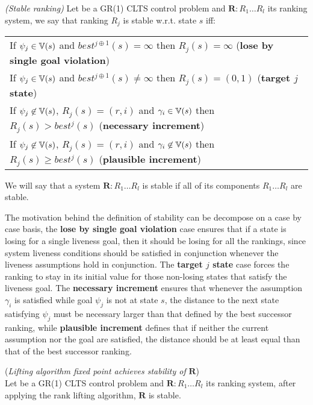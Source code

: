 \begin{definition}\label{def:gr1_stable_ranking} \emph{(Stable ranking)} 
	Let \controlProblemDef be a GR(1) CLTS control problem and $\mathbf{R}:R_1 \ldots R_l$ its ranking system, we say that ranking $R_j$ is stable w.r.t. state $s$ iff:
	\vspace{1em}
	\begin{center}
		\begin{tabular}{l}
			If $\psi_j \in \mathbb{V}(s)$ and $best^{j \oplus 1}(s) = \infty$ then $R_j(s) = \infty$ (\textbf{lose by single goal violation})\\
			If $\psi_j \in \mathbb{V}(s)$ and $best^{j \oplus 1}(s) \neq \infty$ then $R_j(s) = (0,1)$ (\textbf{target $j$ state})\\			
			If $\psi_j \not\in \mathbb{V}(s)$, $R_j(s) = (r,i)$ and $\gamma_i \in \mathbb{V}(s)$ then  $R_j(s) > best^j(s)$ (\textbf{necessary increment})\\						
			If $\psi_j \not\in \mathbb{V}(s)$, $R_j(s) = (r,i)$ and $\gamma_i \not\in \mathbb{V}(s)$ then  $R_j(s) \geq best^j(s)$ (\textbf{plausible increment})\\
		\end{tabular}
	\end{center}
We will say that a system $\mathbf{R}:R_1 \ldots R_l$ is stable if all of its components $R_1 \ldots R_l$ are stable.
\end{definition}

The motivation behind the definition of stability can be decompose on a case by case basis, the \textbf{lose by single goal violation} case ensures that if a state is losing for a single liveness goal, then it should be losing for all the rankings, since system liveness conditions should be satisfied in conjunction whenever the liveness assumptions hold in conjunction. The \textbf{target $j$ state} case forces the ranking to stay in its initial value for those non-losing states that satisfy the liveness goal. The \textbf{necessary increment} ensures that whenever the assumption $\gamma_i$ is satisfied while goal $\psi_j$ is not at state $s$, the distance to the next state satisfying $\psi_j$ must be necessary larger than that defined by the best successor ranking, while \textbf{plausible increment} defines that if neither the current assumption nor the goal are satisfied, the distance should be at least equal than that of the best successor ranking.

\begin{lemma}(\emph{Lifting algorithm fixed point achieves stability of}  $\mathbf{R}$)\label{theorem:gr1_lifting_stability}\\
	Let \controlProblemDef be a GR(1) CLTS control problem and $\mathbf{R}:R_1 \ldots R_l$ its ranking system, after applying the rank lifting algorithm, $\mathbf{R}$ is stable.
\end{lemma}

